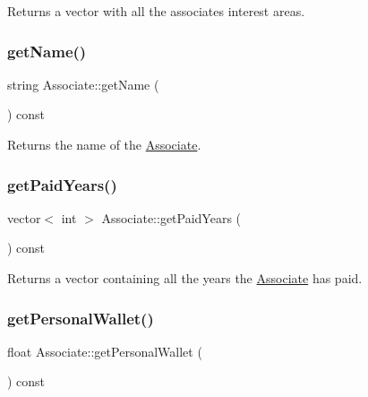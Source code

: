 Returns a vector with all the associate\textquotesingle{}s interest areas. 

\mbox{\label{classAssociate_a85601dd07022fc20f76f9f761fdcec6a}} 
\subsubsection{\texorpdfstring{get\+Name()}{getName()}}
{\footnotesize\ttfamily string Associate\+::get\+Name (\begin{DoxyParamCaption}{ }\end{DoxyParamCaption}) const}



Returns the name of the \hyperlink{classAssociate}{Associate}. 

\mbox{\label{classAssociate_ab3837d6afb9cba8e9f3213ca9b8368b9}} 
\subsubsection{\texorpdfstring{get\+Paid\+Years()}{getPaidYears()}}
{\footnotesize\ttfamily vector$<$ int $>$ Associate\+::get\+Paid\+Years (\begin{DoxyParamCaption}{ }\end{DoxyParamCaption}) const}



Returns a vector containing all the years the \hyperlink{classAssociate}{Associate} has paid. 

\mbox{\label{classAssociate_a75ad2c5af6c2a21fb1828f785751f390}} 
\subsubsection{\texorpdfstring{get\+Personal\+Wallet()}{getPersonalWallet()}}
{\footnotesize\ttfamily float Associate\+::get\+Personal\+Wallet (\begin{DoxyParamCaption}{ }\end{DoxyParamCaption}) const}



